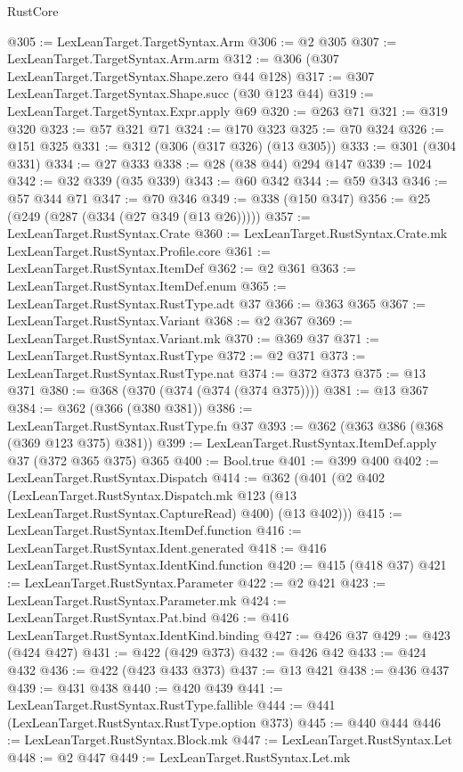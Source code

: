 \begin{lexlean}{RustCore}
\begin{coremodule}
@305 := LexLeanTarget.TargetSyntax.Arm
@306 := @2 @305
@307 := LexLeanTarget.TargetSyntax.Arm.arm
@312 := @306 (@307 LexLeanTarget.TargetSyntax.Shape.zero @44 @128)
@317 := @307 LexLeanTarget.TargetSyntax.Shape.succ (@30 @123 @44)
@319 := LexLeanTarget.TargetSyntax.Expr.apply @69
@320 := @263 @71
@321 := @319 @320
@323 := @57 @321 @71
@324 := @170 @323
@325 := @70 @324
@326 := @151 @325
@331 := @312 (@306 (@317 @326) (@13 @305))
@333 := @301 (@304 @331)
@334 := @27 @333
@338 := @28 (@38 @44) @294 @147
@339 := 1024
@342 := @32 @339 (@35 @339)
@343 := @60 @342
@344 := @59 @343
@346 := @57 @344 @71
@347 := @70 @346
@349 := @338 (@150 @347)
@356 := @25 (@249 (@287 (@334 (@27 @349 (@13 @26)))))
@357 := LexLeanTarget.RustSyntax.Crate
@360 := LexLeanTarget.RustSyntax.Crate.mk LexLeanTarget.RustSyntax.Profile.core
@361 := LexLeanTarget.RustSyntax.ItemDef
@362 := @2 @361
@363 := LexLeanTarget.RustSyntax.ItemDef.enum
@365 := LexLeanTarget.RustSyntax.RustType.adt @37
@366 := @363 @365
@367 := LexLeanTarget.RustSyntax.Variant
@368 := @2 @367
@369 := LexLeanTarget.RustSyntax.Variant.mk
@370 := @369 @37
@371 := LexLeanTarget.RustSyntax.RustType
@372 := @2 @371
@373 := LexLeanTarget.RustSyntax.RustType.nat
@374 := @372 @373
@375 := @13 @371
@380 := @368 (@370 (@374 (@374 (@374 @375))))
@381 := @13 @367
@384 := @362 (@366 (@380 @381))
@386 := LexLeanTarget.RustSyntax.RustType.fn @37
@393 := @362 (@363 @386 (@368 (@369 @123 @375) @381))
@399 := LexLeanTarget.RustSyntax.ItemDef.apply @37 (@372 @365 @375) @365
@400 := Bool.true
@401 := @399 @400
@402 := LexLeanTarget.RustSyntax.Dispatch
@414 := @362
    (@401
      (@2
        @402
        (LexLeanTarget.RustSyntax.Dispatch.mk @123 (@13 LexLeanTarget.RustSyntax.CaptureRead) @400)
        (@13 @402)))
@415 := LexLeanTarget.RustSyntax.ItemDef.function
@416 := LexLeanTarget.RustSyntax.Ident.generated
@418 := @416 LexLeanTarget.RustSyntax.IdentKind.function
@420 := @415 (@418 @37)
@421 := LexLeanTarget.RustSyntax.Parameter
@422 := @2 @421
@423 := LexLeanTarget.RustSyntax.Parameter.mk
@424 := LexLeanTarget.RustSyntax.Pat.bind
@426 := @416 LexLeanTarget.RustSyntax.IdentKind.binding
@427 := @426 @37
@429 := @423 (@424 @427)
@431 := @422 (@429 @373)
@432 := @426 @42
@433 := @424 @432
@436 := @422 (@423 @433 @373)
@437 := @13 @421
@438 := @436 @437
@439 := @431 @438
@440 := @420 @439
@441 := LexLeanTarget.RustSyntax.RustType.fallible
@444 := @441 (LexLeanTarget.RustSyntax.RustType.option @373)
@445 := @440 @444
@446 := LexLeanTarget.RustSyntax.Block.mk
@447 := LexLeanTarget.RustSyntax.Let
@448 := @2 @447
@449 := LexLeanTarget.RustSyntax.Let.mk

\end{coremodule}
\end{lexlean}
